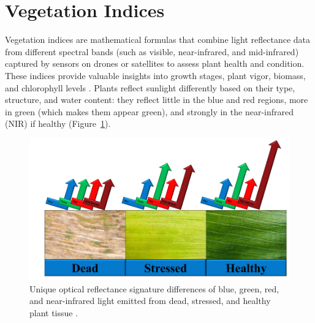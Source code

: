 \section{Vegetation Indices}
Vegetation indices are mathematical formulas that combine light reflectance data from different spectral bands (such as visible, near-infrared, and mid-infrared) captured by sensors on drones or satellites to assess plant health and condition. These indices provide valuable insights into growth stages, plant vigor, biomass, and chlorophyll levels \parencite{sishodia2020applications}. Plants reflect sunlight differently based on their type, structure, and water content: they reflect little in the blue and red regions, more in green (which makes them appear green), and strongly in the near-infrared (NIR) if healthy (Figure~\ref{fig:bluegreenred}). 

\begin{figure}[H]
    \centering
    \includegraphics[width=0.8
    \textwidth]{chapters/chapter3/images/Figure05.png}
    \caption{Unique optical reflectance signature differences of blue, green, red, and near-infrared light emitted from dead, stressed, and healthy plant tissue \protect\parencite{olson2021review}.}
    \label{fig:bluegreenred}
\end{figure}


